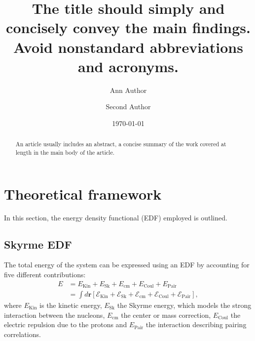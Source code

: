 \documentclass[%
 reprint, linenumbers,
 amsmath,amssymb,
 aps, physrev
]{revtex4-2}
\begin{document}

\title{\textbf{The title should simply and concisely convey the main findings. Avoid nonstandard abbreviations and acronyms.} 
}%


\author{Ann Author}
\author{Second Author}%
%


\date{\today}%

\begin{abstract}
An article usually includes an abstract, a concise summary of the work
covered at length in the main body of the article. 
\end{abstract}

\maketitle


\section{\label{sec:level1}Theoretical framework}
In this section, the energy density functional (EDF) employed is outlined.
\subsection{Skyrme EDF}
The total energy of the system can be expressed using an EDF by accounting for five different contributions:
\begin{align}
\label{eq:functional}
E&= E_\text{Kin} + E_\text{Sk} + E_\text{cm}+E_\text{Coul}+E_\text{Pair}\\
&= \int d\boldsymbol{r}[\mathcal E_\text{Kin} + \mathcal E_\text{Sk} + \mathcal E_\text{cm}+\mathcal E_\text{Coul}+\mathcal E_\text{Pair}],
\end{align}
where $E_\text{Kin}$ is the kinetic energy, $E_\text{Sk}$ the Skyrme energy, which models the strong interaction between the nucleons, $E_\text{cm}$ the center or mass correction, $E_\text{Coul}$ the electric repulsion due to the protons and $E_\text{Pair}$ the interaction describing pairing correlations.
\end{document}
